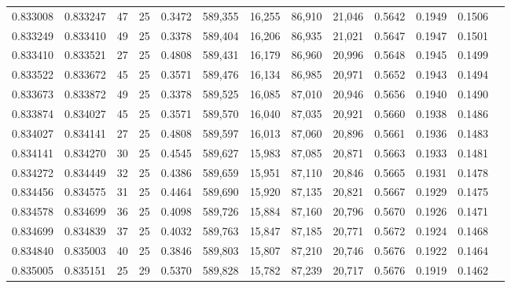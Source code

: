 \begin{tabular}{rrrrrrrrrrrrr}
0.833008 & 0.833247 &    47 &  25 &                                     0.3472 & 589,355 &  16,255 &  86,910 &  21,046 & 0.5642 & 0.1949 & 0.1506 \\
0.833249 & 0.833410 &    49 &  25 &                                     0.3378 & 589,404 &  16,206 &  86,935 &  21,021 & 0.5647 & 0.1947 & 0.1501 \\
0.833410 & 0.833521 &    27 &  25 &                                     0.4808 & 589,431 &  16,179 &  86,960 &  20,996 & 0.5648 & 0.1945 & 0.1499 \\
0.833522 & 0.833672 &    45 &  25 &                                     0.3571 & 589,476 &  16,134 &  86,985 &  20,971 & 0.5652 & 0.1943 & 0.1494 \\
0.833673 & 0.833872 &    49 &  25 &                                     0.3378 & 589,525 &  16,085 &  87,010 &  20,946 & 0.5656 & 0.1940 & 0.1490 \\
0.833874 & 0.834027 &    45 &  25 &                                     0.3571 & 589,570 &  16,040 &  87,035 &  20,921 & 0.5660 & 0.1938 & 0.1486 \\
0.834027 & 0.834141 &    27 &  25 &                                     0.4808 & 589,597 &  16,013 &  87,060 &  20,896 & 0.5661 & 0.1936 & 0.1483 \\
0.834141 & 0.834270 &    30 &  25 &                                     0.4545 & 589,627 &  15,983 &  87,085 &  20,871 & 0.5663 & 0.1933 & 0.1481 \\
0.834272 & 0.834449 &    32 &  25 &                                     0.4386 & 589,659 &  15,951 &  87,110 &  20,846 & 0.5665 & 0.1931 & 0.1478 \\
0.834456 & 0.834575 &    31 &  25 &                                     0.4464 & 589,690 &  15,920 &  87,135 &  20,821 & 0.5667 & 0.1929 & 0.1475 \\
0.834578 & 0.834699 &    36 &  25 &                                     0.4098 & 589,726 &  15,884 &  87,160 &  20,796 & 0.5670 & 0.1926 & 0.1471 \\
0.834699 & 0.834839 &    37 &  25 &                                     0.4032 & 589,763 &  15,847 &  87,185 &  20,771 & 0.5672 & 0.1924 & 0.1468 \\
0.834840 & 0.835003 &    40 &  25 &                                     0.3846 & 589,803 &  15,807 &  87,210 &  20,746 & 0.5676 & 0.1922 & 0.1464 \\
0.835005 & 0.835151 &    25 &  29 &                                     0.5370 & 589,828 &  15,782 &  87,239 &  20,717 & 0.5676 & 0.1919 & 0.1462 \\

\end{tabular}
